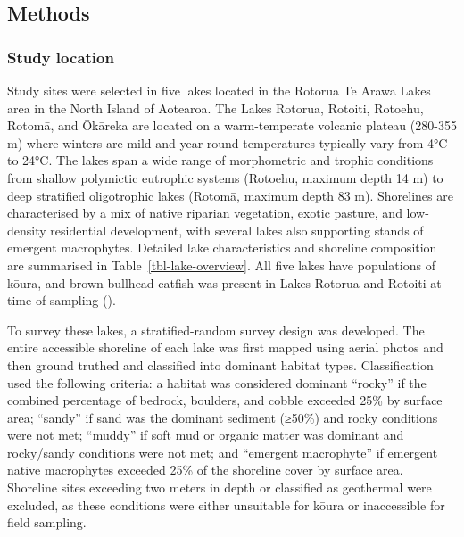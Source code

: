 \documentclass[
  letterpaper,
  DIV=11,
  numbers=noendperiod]{scrartcl}
\begin{document}
\subsection{Methods}\label{methods}

\subsubsection{Study location}\label{study-location}

Study sites were selected in five lakes located in the Rotorua Te Arawa
Lakes area in the North Island of Aotearoa. The Lakes Rotorua, Rotoiti,
Rotoehu, Rotomā, and Ōkāreka are located on a warm-temperate volcanic
plateau (280-355 m) where winters are mild and year-round temperatures
typically vary from 4°C to 24°C. The lakes span a wide range of
morphometric and trophic conditions from shallow polymictic eutrophic
systems (Rotoehu, maximum depth 14 m) to deep stratified oligotrophic
lakes (Rotomā, maximum depth 83 m). Shorelines are characterised by a
mix of native riparian vegetation, exotic pasture, and low-density
residential development, with several lakes also supporting stands of
emergent macrophytes. Detailed lake characteristics and shoreline
composition are summarised in Table~\ref{tbl-lake-overview}. All five
lakes have populations of kōura, and brown bullhead catfish was present
in Lakes Rotorua and Rotoiti at time of sampling
().

To survey these lakes, a stratified-random survey design was developed.
The entire accessible shoreline of each lake was first mapped using
aerial photos and then ground truthed and classified into dominant
habitat types. Classification used the following criteria: a habitat was
considered dominant ``rocky'' if the combined percentage of bedrock,
boulders, and cobble exceeded 25\% by surface area; ``sandy'' if sand
was the dominant sediment (≥50\%) and rocky conditions were not met;
``muddy'' if soft mud or organic matter was dominant and rocky/sandy
conditions were not met; and ``emergent macrophyte'' if emergent native
macrophytes exceeded 25\% of the shoreline cover by surface area.
Shoreline sites exceeding two meters in depth or classified as
geothermal were excluded, as these conditions were either unsuitable for
kōura or inaccessible for field sampling.
\end{document}

